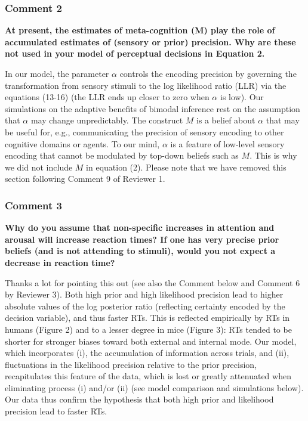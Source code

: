 \documentclass[
]{article}
\begin{document}
\hypertarget{comment-2}{%
\subsubsection{Comment 2}\label{comment-2}}

\textbf{At present, the estimates of meta-cognition (M) play the role of
accumulated estimates of (sensory or prior) precision. Why are these not
used in your model of perceptual decisions in Equation 2.}

In our model, the parameter \(\alpha\) controls the encoding precision
by governing the transformation from sensory stimuli to the log
likelihood ratio (LLR) via the equations (13-16) (the LLR ends up closer
to zero when \(\alpha\) is low). Our simulations on the adaptive
benefits of bimodal inference rest on the assumption that \(\alpha\) may
change unpredictably. The construct \(M\) is a belief about \(\alpha\)
that may be useful for, e.g., communicating the precision of sensory
encoding to other cognitive domains or agents. To our mind, \(\alpha\)
is a feature of low-level sensory encoding that cannot be modulated by
top-down beliefs such as \(M\). This is why we did not include \(M\) in
equation (2). Please note that we have removed this section following
Comment 9 of Reviewer 1.

\hypertarget{comment-3}{%
\subsubsection{Comment 3}\label{comment-3}}

\textbf{Why do you assume that non-specific increases in attention and
arousal will increase reaction times? If one has very precise prior
beliefs (and is not attending to stimuli), would you not expect a
decrease in reaction time?}

Thanks a lot for pointing this out (see also the Comment below and
Comment 6 by Reviewer 3). Both high prior and high likelihood precision
lead to higher absolute values of the log posterior ratio (reflecting
certainty encoded by the decision variable), and thus faster RTs. This
is reflected empirically by RTs in humans (Figure 2) and to a lesser
degree in mice (Figure 3): RTs tended to be shorter for stronger biases
toward both external and internal mode. Our model, which incorporates
(i), the accumulation of information across trials, and (ii),
fluctuations in the likelihood precision relative to the prior
precision, recapitulates this feature of the data, which is lost or
greatly attenuated when eliminating process (i) and/or (ii) (see model
comparison and simulations below). Our data thus confirm the hypothesis
that both high prior and likelihood precision lead to faster RTs.
\end{document}
